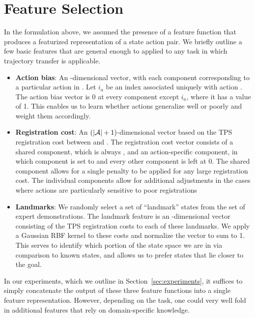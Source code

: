 \section{Feature Selection}
\label{sec:features}


In the formulation above, we assumed the presence of a feature function
 that produces a featurized representation of a state action pair.
We briefly outline a few basic features that are general enough to applied to
any task in which trajectory transfer is applicable. 

\begin{itemize}
  \item \textbf{Action bias}: An \actionsetsize{}-dimensional vector, with each
    component corresponding to a particular action in \actionset{}. Let $i_a$
    be an index associated uniquely with action \actionvar{}. The action bias vector is 0
    at every component except $i_a$, where it has a value of 1. This enables us
    to learn whether actions generalize well or poorly and weight them
    accordingly.
  \item \textbf{Registration cost}: An $(\mathcal{|A|}{}+1)$-dimensional vector
    based on the TPS registration cost \regcost{} between \statevar{} and . The
    registration cost vector consists of a shared component, which is always
    \regcost{}, and an action-specific component, in which component  is set to
    \regcost{} and every other component is left at 0. The shared component allows for
    a single penalty to be applied for any large registration cost. The
    individual components allow for additional adjustments in the cases where
    actions are particularly sensitive to poor registrations
  \item \textbf{Landmarks}: We randomly select a set of ``landmark'' states \landmarkset{}
    from the set of expert demonstrations. The landmark feature is an
    \landmarksetsize{}-dimensional vector consisting of the TPS registration costs to each of
    these landmarks. We apply a Gaussian RBF kernel to these costs and normalize
    the vector to sum to 1. This serves to identify which portion of the state
    space we are in via comparison to known states, and allows us to prefer
    states that lie closer to the goal.
\end{itemize}

In our experiments, which we outline in Section~\ref{sec:experiments}, it
suffices to simply concatenate the output of these three feature functions into
a single feature representation. However, depending on the task, one could
very well fold in additional features that rely on domain-specific knowledge.
